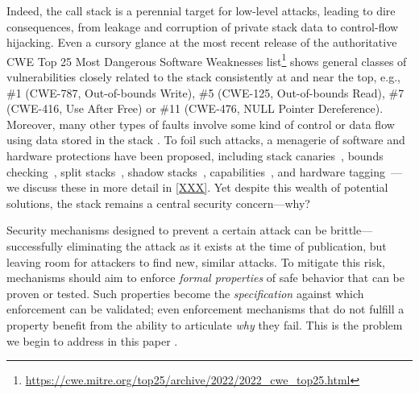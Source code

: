 Indeed, the call stack is a perennial target for low-level attacks, leading to
dire consequences, from leakage and corruption of private stack data
to control-flow hijacking.
%
Even a cursory glance at the most recent release of the authoritative CWE Top 25
Most Dangerous Software Weaknesses
list\footnote{\url{https://cwe.mitre.org/top25/archive/2022/2022_cwe_top25.html}}
shows general classes of vulnerabilities closely related to the stack 
consistently at and near the top, e.g., \#1 (CWE-787, Out-of-bounds Write), \#5 (CWE-125, Out-of-bounds Read), \#7 (CWE-416, Use
After Free) or \#11 (CWE-476, NULL Pointer Dereference).
%
Moreover, many other types of faults involve some kind of control or data flow
using data stored in the stack .
%
To foil such attacks, a menagerie of
software and hardware protections have been proposed,
%
including stack canaries~\cite{Cowan+98},
bounds checking~\cite{NagarakatteZMZ09,NagarakatteZMZ10,DeviettiBMZ08},
split stacks~\cite{Kuznetsov+14},
shadow stacks~\cite{Dang+15,Shanbhogue+19},
capabilities~\cite{Woodruff+14,Chisnall+15,SkorstengaardLocal,SkorstengaardSTKJFP,Georges+21},
and hardware tagging~\cite{DBLP:conf/sp/RoesslerD18}---we discuss these in more
detail in \cref{XXX}.
  \ifaftersubmission{}
\fi
%
%
Yet despite this wealth of potential solutions, the stack remains a central
security concern---why?

Security mechanisms designed to prevent a certain attack can be brittle---successfully
eliminating the attack as it exists at the time of publication, but leaving room for attackers
to find new, similar attacks.
%
%
To mitigate this risk,  mechanisms should aim to enforce \emph{formal
properties} of safe behavior that can be proven or tested. Such properties become the
\emph{specification} against which enforcement can be validated; even enforcement mechanisms that do
not fulfill a property benefit from the ability to articulate \emph{why} they fail.
%
%
This is the problem we begin to address in this paper .

